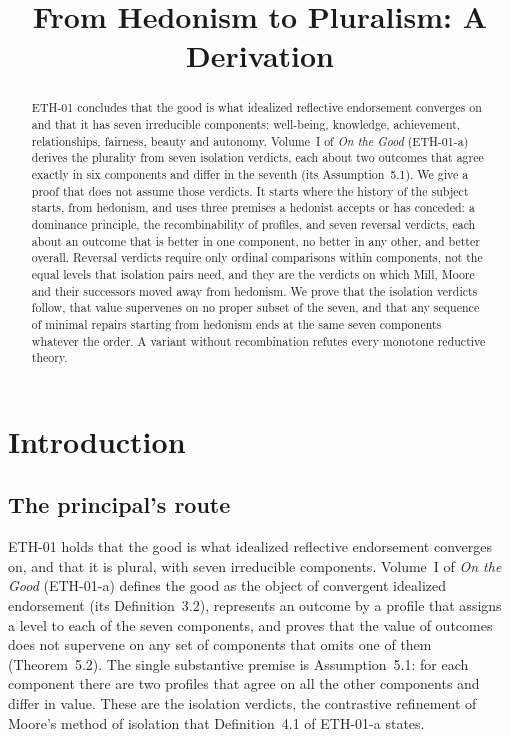 \documentclass{situationist-preprint}
\title{From Hedonism to Pluralism: A Derivation}
\begin{document}
\maketitle

\begin{abstract}
ETH-01 concludes that the good is what idealized reflective endorsement converges on and that it has seven irreducible components: well-being, knowledge, achievement, relationships, fairness, beauty and autonomy. Volume~I of \emph{On the Good} (ETH-01-a) derives the plurality from seven isolation verdicts, each about two outcomes that agree exactly in six components and differ in the seventh (its Assumption~5.1). We give a proof that does not assume those verdicts. It starts where the history of the subject starts, from hedonism, and uses three premises a hedonist accepts or has conceded: a dominance principle, the recombinability of profiles, and seven reversal verdicts, each about an outcome that is better in one component, no better in any other, and better overall. Reversal verdicts require only ordinal comparisons within components, not the equal levels that isolation pairs need, and they are the verdicts on which Mill, Moore and their successors moved away from hedonism. We prove that the isolation verdicts follow, that value supervenes on no proper subset of the seven, and that any sequence of minimal repairs starting from hedonism ends at the same seven components whatever the order. A variant without recombination refutes every monotone reductive theory.
\end{abstract}

\section{Introduction}\label{s:intro}

\subsection{The principal's route}

ETH-01 holds that the good is what idealized reflective endorsement converges on, and that it is plural, with seven irreducible components. Volume~I of \emph{On the Good} (ETH-01-a) defines the good as the object of convergent idealized endorsement (its Definition~3.2), represents an outcome by a profile that assigns a level to each of the seven components, and proves that the value of outcomes does not supervene on any set of components that omits one of them (Theorem~5.2). The single substantive premise is Assumption~5.1: for each component there are two profiles that agree on all the other components and differ in value. These are the isolation verdicts, the contrastive refinement of Moore's method of isolation \citep[\S112]{Moore1903} that Definition~4.1 of ETH-01-a states.
\end{document}

